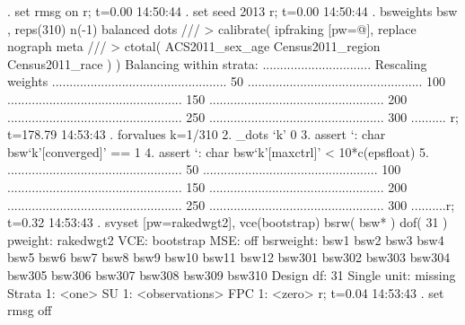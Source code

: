 . set rmsg on
r; t=0.00 14:50:44
{\smallskip}
. set seed 2013
r; t=0.00 14:50:44
{\smallskip}
. bsweights bsw , reps(310) n(-1) balanced dots ///
>     calibrate( ipfraking [pw=@], replace nograph meta ///
>     ctotal( ACS2011_sex_age Census2011_region Census2011_race ) )
Balancing within strata:
...............................
{\smallskip}
Rescaling weights
..................................................    50
..................................................   100
..................................................   150
..................................................   200
..................................................   250
..................................................   300
..........
{\smallskip}
r; t=178.79 14:53:43
{\smallskip}
. forvalues k=1/310 {\lbr}
  2.     _dots `k' 0
  3.     assert `: char bsw`k'[converged]' == 1
  4.     assert `: char bsw`k'[maxctrl]' < 10*c(epsfloat)
  5. {\rbr}
..................................................    50
..................................................   100
..................................................   150
..................................................   200
..................................................   250
..................................................   300
..........r; t=0.32 14:53:43
{\smallskip}
. svyset [pw=rakedwgt2], vce(bootstrap) bsrw( bsw* ) dof( 31 )
{\smallskip}
      pweight: rakedwgt2
          VCE: bootstrap
          MSE: off
    bsrweight: bsw1 bsw2 bsw3 bsw4 bsw5 bsw6 bsw7 bsw8 bsw9 bsw10 bsw11 bsw12
\oom
               bsw301 bsw302 bsw303 bsw304 bsw305 bsw306 bsw307 bsw308 bsw309
               bsw310
    Design df: 31
  Single unit: missing
     Strata 1: <one>
         SU 1: <observations>
        FPC 1: <zero>
r; t=0.04 14:53:43
{\smallskip}
. set rmsg off
{\smallskip}
